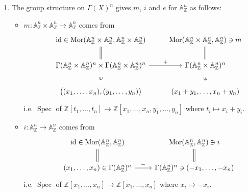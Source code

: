 \documentclass{report}
\newcommand{\id}{{\mathrm{id}}} %
\newcommand{\A}{\mathbb{A}}
\newcommand{\Z}{\mathbb{Z}}
\DeclareMathOperator{\Mor}{Mor}
\DeclareMathOperator{\Spec}{Spec}
\begin{document}
\begin{enumerate}[label=\textbf{6.6.\Alph*.}]
	\item The group structure on $\Gamma(X)^n$ gives $m$, $i$ and $e$ for
	      $\A^n_\Z$ as follows:
	      \begin{itemize}
		      \item $m:\A^n_\Z\times\A^n_\Z\to\A^n_\Z$ comes from
		            \begin{equation*}
			            \begin{tikzcd}[in/.style = {draw=none,"\in" description,sloped}]
				            &\id\in\Mor(\A^n_\Z\times\A^n_\Z,\A^n_\Z\times\A^n_\Z) \ar[d,equal]
				            &\Mor(\A^n_\Z\times\A^n_\Z,\A^n_\Z)\ni m \ar[d,equal] \\
				            &\Gamma(\A^n_\Z\times\A^n_\Z)^n\times\Gamma(\A^n_\Z\times\A^n_\Z)^n \ar[r,"+"]
				            &\Gamma(\A^n_\Z\times\A^n_\Z)^n \\
				            &\bigl((x_1,\ldots,x_n),(y_1,\ldots,y_n)\bigr) \ar[u,in]
				            &(x_1+y_1,\ldots,x_n+y_n) \ar[u,in]
			            \end{tikzcd}
		            \end{equation*}
		            i.e. $\Spec$ of
		            $\Z[t_1,\ldots,t_n]\to\Z[x_1,\ldots,x_n,y_1,\ldots,y_n]$ where
		            $t_i\mapsto x_i+y_i$.

		      \item $i:\A^n_\Z\to\A^n_\Z$ comes from
		            \begin{equation*}
			            \begin{tikzcd}
				            &\id\in\Mor(\A^n_\Z,\A^n_\Z) \ar[d,equal]
				            &\Mor(\A^n_\Z,\A^n_\Z)\ni i \ar[d,equal] \\
				            &(x_1,\ldots,x_n)\in\Gamma(\A^n_\Z)^n \ar[r,"-"]
				            &\Gamma(\A^n_\Z)^n\ni(-x_1,\ldots,-x_n)
			            \end{tikzcd}
		            \end{equation*}
		            i.e. $\Spec$ of $\Z[x_1,\ldots,x_n]\to\Z[x_1,\ldots,x_n]$
		            where $x_i\mapsto -x_i$.


\end{itemize}
\end{enumerate}
\end{document}
